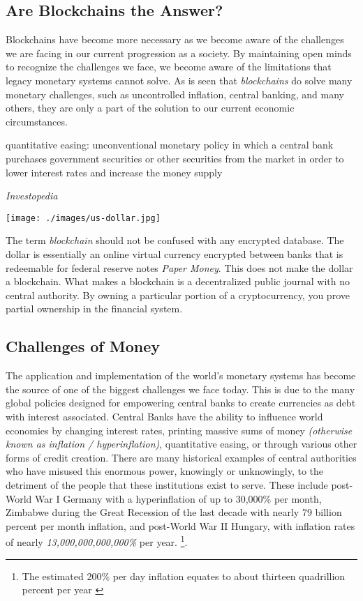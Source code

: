 \documentclass[11pt]{article}
\begin{document}
\subsection{Are Blockchains the Answer?}

Blockchains have become more necessary as we become aware of the challenges we are facing in our current progression as a society.
By maintaining open minds to recognize the challenges we face, we become aware of the limitations that legacy monetary systems cannot solve. 
As is seen that \textit{blockchains} do solve many monetary challenges, such as uncontrolled inflation, central banking, and many others, they are only a part of the solution to our current economic circumstances.

\epigraph{quantitative easing: unconventional monetary policy in which a central bank purchases government securities or other securities from the market in order to lower interest rates and increase the money supply}{\textit{Investopedia}}

\vspace{-138pt}
\hspace{-25pt}
\texttt{[image: ./images/us-dollar.jpg]}
\vspace{5pt}

\noindent
The term \textit{blockchain} should not be confused with any encrypted database. The dollar is essentially an online virtual currency encrypted between banks that is redeemable for federal reserve notes \textit{Paper Money}. This does not make the dollar a blockchain. What makes a blockchain is a decentralized public journal with no central authority. 
By owning a particular portion of a cryptocurrency, you prove partial ownership in the financial system.

\subsection{Challenges of Money}

The application and implementation of the world's monetary systems has become the source of one of the biggest challenges we face today.
This is due to the many global policies designed for empowering central banks to create currencies as debt with interest associated. 
Central Banks have the ability to influence world economies by changing interest rates, printing massive sums of money \textit{(otherwise known as inflation / hyperinflation)}, quantitative easing, or through various other forms of credit creation.
There are many historical examples of central authorities who have misused this enormous power, knowingly or unknowingly, to the detriment of the people that these institutions exist to serve. 
These include post-World War I Germany with a hyperinflation of up to 30,000\% per month, Zimbabwe during the Great Recession of the last decade with nearly 79 billion percent per month inflation, and post-World War II Hungary, with inflation rates of nearly \textit{13,000,000,000,000\%} per year.  \footnote{The estimated 200\% per day inflation equates to about thirteen quadrillion percent per year \cite{hyperinflation}}.
\end{document}
